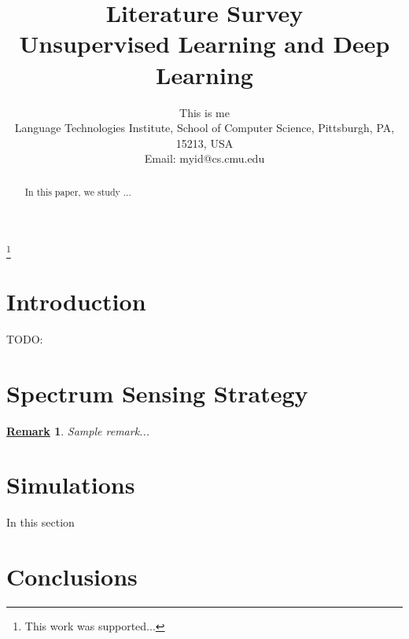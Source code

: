 \documentclass[conference]{IEEEtran}
\newtheorem{remark}{\underline{Remark}}
\begin{document}
\title{Literature Survey \\ Unsupervised Learning and Deep Learning}
\author{This is me\\%
Language Technologies Institute, School of Computer Science, Pittsburgh, PA, 15213, USA\\
Email: myid@cs.cmu.edu
}

\thanks{This work was supported...}




\maketitle %




\begin{abstract}
In this paper, we study ...

\end{abstract}



\section{Introduction}

TODO:

\section{Spectrum Sensing Strategy}






\begin{remark}
Sample remark...
\end{remark}



\section{Simulations}\label{sec:simulation}

In this section



\section{Conclusions}
\end{document}
